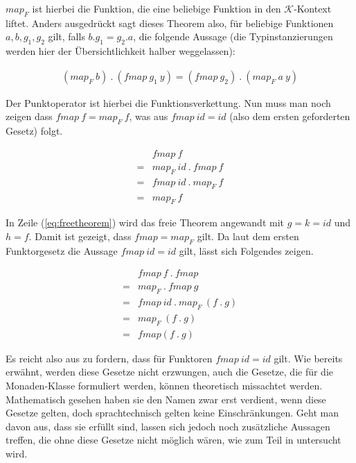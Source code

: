 $map_F$ ist hierbei die Funktion, die eine beliebige Funktion in den $\mathcal{K}$-Kontext liftet.
Anders ausgedrückt sagt dieses Theorem also, für beliebige Funktionen $a, b, g_1, g_2$ gilt, falls $b . g_1 = g_2 . a$, die folgende Aussage
(die Typinstanzierungen werden hier der Übersichtlichkeit halber weggelassen):

\begin{align*}
(map_F\ b)\ .\ (fmap\ g_1\ y) = (fmap\ g_2)\ .\ (map_F\ a\ y)
\end{align*}

Der Punktoperator ist hierbei die Funktionsverkettung. Nun muss man noch zeigen dass $fmap\ f = map_F\ f$, was aus $fmap\ id = id$ (also dem ersten geforderten Gesetz) folgt.

\begin{align}
& fmap\ f \nonumber \\
= & map_F\ id\ .\ fmap\ f \nonumber \\
= & fmap\ id\ .\ map_F\ f \label{eq:freetheorem} \\
= & map_F\ f \nonumber
\end{align}

In Zeile (\ref{eq:freetheorem}) wird das freie Theorem angewandt mit $g = k = id$ und $h = f$.  Damit ist gezeigt, dass $fmap = map_F$ gilt. Da laut dem ersten Funktorgesetz die Aussage $fmap\ id = id$ gilt, lässt sich Folgendes zeigen.

\begin{align*}
& fmap\ f\ .\ fmap \\
= & map_F\ .\ fmap\ g \\
= & fmap\ id\ .\ map_F\ (f\ .\ g) \\
= & map_F\ (f\ .\ g) \\
= & fmap (f\ .\ g)
\end{align*}

Es reicht also aus zu fordern, dass für Funktoren $fmap\ id = id$ gilt. Wie bereits erwähnt, werden diese Gesetze nicht
erzwungen, auch die Gesetze, die für die Monaden-Klasse formuliert werden, können theoretisch missachtet werden.
Mathematisch gesehen haben sie den Namen zwar erst verdient, wenn diese Gesetze gelten, doch sprachtechnisch gelten keine
Einschränkungen. Geht man davon aus, dass sie erfüllt sind, lassen sich jedoch noch zusätzliche Aussagen treffen, die ohne diese
Gesetze nicht möglich wären, wie zum Teil in \cite{voigtlander} untersucht wird.

